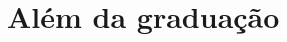 \documentclass[a4paper,10pt,twocolumn]{book}
\begin{document}
\chapter{Além da graduação}

\newpage

\newpage





\end{document}
